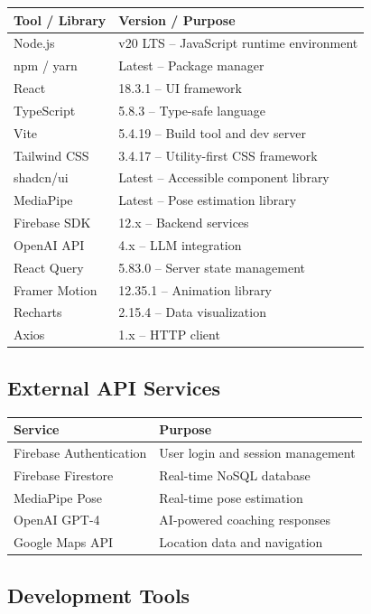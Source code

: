 \documentclass[12pt,a4paper]{article}
\begin{document}
\begin{longtable}{p{5cm} p{7.5cm}}
\toprule
\textbf{Tool / Library} & \textbf{Version / Purpose} \\
\midrule
\endhead
Node.js & v20 LTS -- JavaScript runtime environment \\
npm / yarn & Latest -- Package manager \\
React & 18.3.1 -- UI framework \\
TypeScript & 5.8.3 -- Type-safe language \\
Vite & 5.4.19 -- Build tool and dev server \\
Tailwind CSS & 3.4.17 -- Utility-first CSS framework \\
shadcn/ui & Latest -- Accessible component library \\
MediaPipe & Latest -- Pose estimation library \\
Firebase SDK & 12.x -- Backend services \\
OpenAI API & 4.x -- LLM integration \\
React Query & 5.83.0 -- Server state management \\
Framer Motion & 12.35.1 -- Animation library \\
Recharts & 2.15.4 -- Data visualization \\
Axios & 1.x -- HTTP client \\
\bottomrule
\end{longtable}

\subsection{External API Services}

\begin{longtable}{p{5cm} p{7.5cm}}
\toprule
\textbf{Service} & \textbf{Purpose} \\
\midrule
\endhead
Firebase Authentication & User login and session management \\
Firebase Firestore & Real-time NoSQL database \\
MediaPipe Pose & Real-time pose estimation \\
OpenAI GPT-4 & AI-powered coaching responses \\
Google Maps API & Location data and navigation \\
\bottomrule
\end{longtable}

\subsection{Development Tools}
\end{document}
